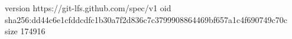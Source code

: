 version https://git-lfs.github.com/spec/v1
oid sha256:dd44c6e1cfddcdfc1b30a7f2d836c7c3799908864469bf657a1c4f690749c70c
size 174916
